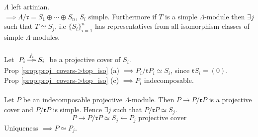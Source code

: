 \begin{recall}
$\Lambda$ left artinian.\\
$\implies \Lambda / \mathfrak{r} = S_1 \oplus \cdots \oplus S_n$, $S_i$ simple. Furthermore if $T$ is a simple $\Lambda$-module then $\exists j$ such that $T \simeq S_j$, i.e $\{ S_i \}_{i=1}^n$ has representatives from all isomorphism classes of simple $\Lambda$-modules.\\
\\
Let $\xymatrix@C-1pc{P_i \ar[r]^{f_i} & S_i}$ be a projective cover of $S_i$.\\
Prop \ref{prop:proj_covers->top_iso} (a) $\implies P_i / \mathfrak{r}P_i \simeq S_i$, since $\mathfrak{r}S_i = (0)$.\\
Prop \ref{prop:proj_covers->top_iso} (c) $\implies P_i$ indecomposable.\\
\\
Let $P$ be an indecomposable projective $\Lambda$-module. Then $P \to P/\mathfrak{r}P$ is a projective cover and $P/\mathfrak{r}P$ is simple. Hence $\exists j$ such that $P/\mathfrak{r}P \simeq S_j$.
$$P \to P/\mathfrak{r}P \simeq S_j \leftarrow P_j \text{ projective cover}$$
Uniqueness $\implies P \simeq P_j$.
\end{recall}

